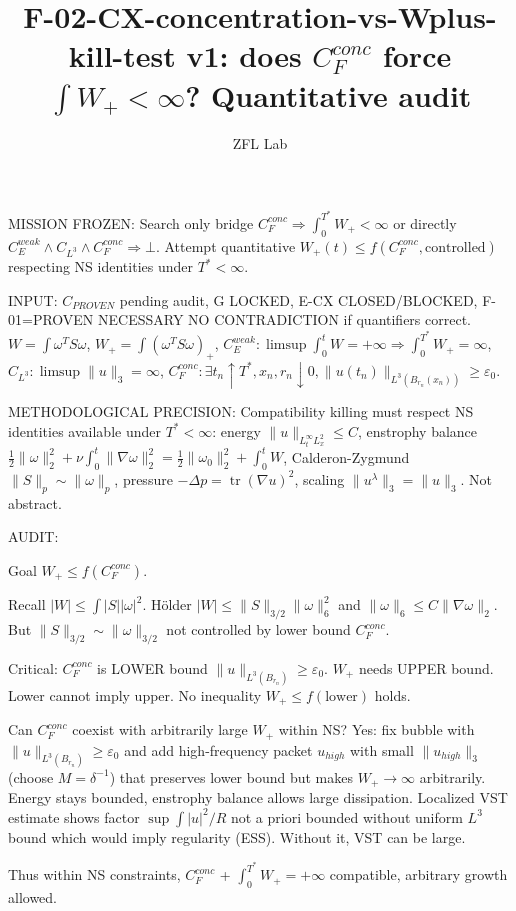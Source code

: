 \documentclass[11pt]{article}
\title{F-02-CX-concentration-vs-Wplus-kill-test v1: does $C_F^{conc}$ force $\int W_+<\infty$? Quantitative audit}
\author{ZFL Lab}
\begin{document}
\maketitle

MISSION FROZEN: Search only bridge $C_F^{conc}\Rightarrow\int_0^{T^*}W_+<\infty$ or directly $C_E^{weak}\land C_{L^3}\land C_F^{conc}\Rightarrow\bot$. Attempt quantitative $W_+(t)\le f(C_F^{conc},\text{controlled})$ respecting NS identities under $T^*<\infty$.

INPUT: $C_{PROVEN}$ pending audit, G LOCKED, E-CX CLOSED/BLOCKED, F-01=PROVEN NECESSARY NO CONTRADICTION if quantifiers correct. $W=\int\omega^T S\omega$, $W_+=\int(\omega^T S\omega)_+$, $C_E^{weak}:\limsup\int_0^tW=+\infty\Rightarrow\int_0^{T^*}W_+=\infty$, $C_{L^3}:\limsup\|u\|_3=\infty$, $C_F^{conc}:\exists t_n\uparrow T^*,x_n,r_n\downarrow0,\|u(t_n)\|_{L^3(B_{r_n}(x_n))}\ge\varepsilon_0$.

METHODOLOGICAL PRECISION: Compatibility killing must respect NS identities available under $T^*<\infty$: energy $\|u\|_{L^\infty_tL^2_x}\le C$, enstrophy balance $\frac12\|\omega\|_2^2+\nu\int_0^t\|\nabla\omega\|_2^2=\frac12\|\omega_0\|_2^2+\int_0^tW$, Calderon-Zygmund $\|S\|_p\sim\|\omega\|_p$, pressure $-\Delta p=\operatorname{tr}(\nabla u)^2$, scaling $\|u^\lambda\|_3=\|u\|_3$. Not abstract.

AUDIT:

Goal $W_+\le f(C_F^{conc})$.

Recall $|W|\le\int|S||\omega|^2$. H\"older $|W|\le\|S\|_{3/2}\|\omega\|_6^2$ and $\|\omega\|_6\le C\|\nabla\omega\|_2$. But $\|S\|_{3/2}\sim\|\omega\|_{3/2}$ not controlled by lower bound $C_F^{conc}$.

Critical: $C_F^{conc}$ is LOWER bound $\|u\|_{L^3(B_{r_n})}\ge\varepsilon_0$. $W_+$ needs UPPER bound. Lower cannot imply upper. No inequality $W_+\le f(\text{lower})$ holds.

Can $C_F^{conc}$ coexist with arbitrarily large $W_+$ within NS? Yes: fix bubble with $\|u\|_{L^3(B_{r_n})}\ge\varepsilon_0$ and add high-frequency packet $u_{high}$ with small $\|u_{high}\|_3$ (choose $M=\delta^{-1}$) that preserves lower bound but makes $W_+\to\infty$ arbitrarily. Energy stays bounded, enstrophy balance allows large dissipation. Localized VST estimate shows factor $\sup\int|u|^2/R$ not a priori bounded without uniform $L^3$ bound which would imply regularity (ESS). Without it, VST can be large.

Thus within NS constraints, $C_F^{conc}$ + $\int_0^{T^*}W_+=+\infty$ compatible, arbitrary growth allowed.
\end{document}
